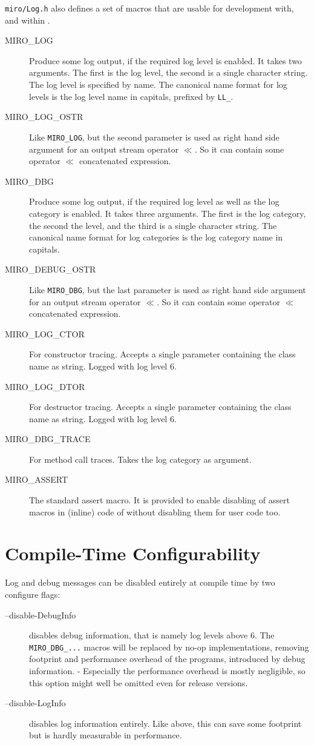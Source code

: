 \texttt{miro/Log.h} also defines a set of macros that are usable for
development with, and within \miro.
\begin{description}
\item[MIRO\_LOG] Produce some log output, if the required log
  level is enabled. It takes two arguments. The first is the log level,
  the second is a single character string. The log level is specified
  by name. The canonical name format for log levels is the log level
  name in capitals, prefixed by \texttt{LL\_}.
\item[MIRO\_LOG\_OSTR] Like \texttt{MIRO\_LOG}, but the second
  parameter is used as right hand side argument for an output stream
  operator $\ll$. So it can contain some operator $\ll$ concatenated
  expression.
\item[MIRO\_DBG] Produce some log output, if the required log level as
  well as the log category is enabled. It takes three arguments. The
  first is the log category, the second the level, and the third is a
  single character string. The canonical name format for log
  categories is the log category name in capitals.
\item[MIRO\_DEBUG\_OSTR] Like \texttt{MIRO\_DBG}, but the last
  parameter is used as right hand side argument for an output stream
  operator $\ll$. So it can contain some operator $\ll$ concatenated
  expression.
\item[MIRO\_LOG\_CTOR] For constructor tracing. Accepts a single
  parameter containing the class name as string. Logged with log level
  6.
\item[MIRO\_LOG\_DTOR] For destructor tracing. Accepts a single
  parameter containing the class name as string. Logged with log level
  6.
\item[MIRO\_DBG\_TRACE] For method call traces. Takes the log
  category as argument.
\item[MIRO\_ASSERT] The standard assert macro. It is provided to
  enable disabling of assert macros in (inline) code of \miro without
  disabling them for user code too.
\end{description}

\section{Compile-Time Configurability}

Log and debug messages can be disabled entirely at compile time by two
configure flags: 
\begin{description}
\item[--disable-DebugInfo] disables debug information, that is namely
  log levels above 6. The \texttt{MIRO\_DBG\_...} macros will be
  replaced by no-op implementations, removing footprint and performance
  overhead of the programs, introduced by debug information. -
  Especially the performance overhead is mostly negligible, so this
  option might well be omitted even for release versions.
\item[--disable-LogInfo] disables log information entirely. Like
  above, this can save some footprint but is hardly measurable in
  performance.
\end{description}

